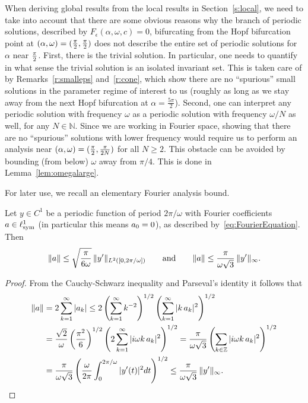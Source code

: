 
When deriving global results from the local results in
Section~\ref{s:local}, we need to take into account that there are some obvious
reasons why the branch of periodic solutions, described by
$F_\epsilon(\alpha,\omega,c)=0$, bifurcating from the Hopf bifurcation point at
$(\alpha,\omega)=(\tfrac{\pi}{2},\tfrac{\pi}{2})$ does not describe the entire set of periodic
solutions for $\alpha$ near $\tfrac{\pi}{2}$. First, there is the trivial solution. In
particular, one needs to quantify in what sense the trivial solution is an
isolated invariant set. This is taken care of by Remarks~\ref{r:smalleps}
and~\ref{r:cone}, which show there are no ``spurious'' small solutions in the
parameter regime of interest to us (roughly as long as we stay away from the
next Hopf bifurcation at $\alpha = \tfrac{5\pi}{2}$). Second, one can interpret any periodic
solution with frequency $\omega$ as a periodic solution with frequency
$\omega/N$ as well, for any $N \in \mathbb{N}$. Since we are working in Fourier space,
showing that there are no ``spurious'' solutions with lower frequency would
require us to perform an analysis near $(\alpha,\omega)=(\tfrac{\pi}{2},\tfrac{\pi}{2N})$
for all $N \geq 2$. This obstacle can be avoided by bounding (from below)
$\omega$ away from $\pi/4$. This is done in Lemma~\ref{lem:omegalarge}.

For later use, we recall an elementary Fourier analysis bound. 
\begin{lemma}\label{lem:fourierbound}
	Let $y \in C^1$ be a periodic function of period $2\pi/\omega$ with Fourier coefficients $a \in \ell^1_{\text{\textup{sym}}}$ (in particular this means $a_0=0$), as described by~\eqref{eq:FourierEquation}. 
	Then 
\[
 \| a \| \leq \sqrt{\frac{\pi }{6 \omega}}\,  \| y' \|_{L^2([0,2\pi/\omega])}
\qquad\text{and}\qquad
 \| a \| \leq \frac{\pi}{\omega\sqrt{3}}\, \|y'\|_\infty.
 \]
\end{lemma}
\begin{proof}
From the Cauchy-Schwarz inequality and  Parseval's identity it follows that
\begin{alignat*}{1}
		\| a \| &= 2 \sum_{k=1}^{\infty} |a_k|
		\leq 2 \left( \sum_{k=1}^{\infty} k^{-2} \right)^{1/2}
		\left( \sum_{k=1}^{\infty} |k \, a_k|^2 \right)^{1/2} \\
     &=  \frac{\sqrt{2}}{\omega} \left(\frac{\pi^2}{6} \right)^{1/2} 
	 	 \left(2 \sum_{k=1}^{\infty} |i \omega k \, a_k|^2 \right)^{1/2}
		 = \frac{\pi}{\omega \sqrt{3}} 
		\left(\sum_{k \in \mathbb{Z}} |i \omega k \, a_k|^2 \right)^{1/2}\\
		&= \frac{\pi}{\omega \sqrt{3}} 
		\left( \frac{\omega}{2\pi} \int_0^{2\pi/\omega} | y'(t)|^2 dt  \right)^{1/2} 
		\leq \frac{\pi}{\omega \sqrt{3}} \,  \|y'\|_\infty.
\end{alignat*}	
\end{proof}


